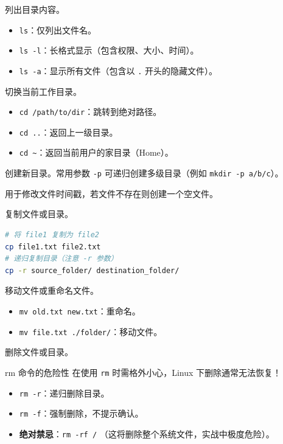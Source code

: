\documentclass[12pt, a4paper]{article}
\begin{document}
\begin{description}[style=multiline, leftmargin=3cm, font=\bfseries\ttfamily]
    \item[ls (List)] 列出目录内容。
    \begin{itemize}
        \item \texttt{ls}：仅列出文件名。
        \item \texttt{ls -l}：长格式显示（包含权限、大小、时间）。
        \item \texttt{ls -a}：显示所有文件（包含以 \texttt{.} 开头的隐藏文件）。
    \end{itemize}

    \item[cd] 切换当前工作目录。
    \begin{itemize}
        \item \texttt{cd /path/to/dir}：跳转到绝对路径。
        \item \texttt{cd ..}：返回上一级目录。
        \item \texttt{cd \textasciitilde}：返回当前用户的家目录（Home）。
    \end{itemize}

    \item[mkdir] 创建新目录。常用参数 \texttt{-p} 可递归创建多级目录（例如 \texttt{mkdir -p a/b/c}）。

    \item[touch] 用于修改文件时间戳，若文件不存在则创建一个空文件。
    
    \item[cp] 复制文件或目录。
    \begin{lstlisting}[language=bash, style=mystyle, caption={cp 命令示例}]
# 将 file1 复制为 file2
cp file1.txt file2.txt 
# 递归复制目录（注意 -r 参数）
cp -r source_folder/ destination_folder/
    \end{lstlisting}

    \item[mv] 移动文件或重命名文件。
    \begin{itemize}
        \item \texttt{mv old.txt new.txt}：重命名。
        \item \texttt{mv file.txt ./folder/}：移动文件。
    \end{itemize}

    \item[rm] 删除文件或目录。
\end{description}

\begin{trapbox}{rm 命令的危险性}
在使用 \texttt{rm} 时需格外小心，Linux 下删除通常无法恢复！
\begin{itemize}
    \item \texttt{rm -r}：递归删除目录。
    \item \texttt{rm -f}：强制删除，不提示确认。
    \item \textbf{绝对禁忌}：\texttt{rm -rf /} （这将删除整个系统文件，实战中极度危险）。
\end{itemize}
\end{trapbox}
\end{document}
